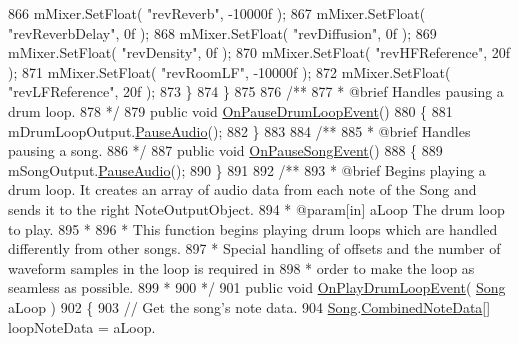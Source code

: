 \begin{DoxyCodeInclude}
866             mMixer.SetFloat( \textcolor{stringliteral}{"revReverb"}, -10000f );
867             mMixer.SetFloat( \textcolor{stringliteral}{"revReverbDelay"}, 0f );
868             mMixer.SetFloat( \textcolor{stringliteral}{"revDiffusion"}, 0f );
869             mMixer.SetFloat( \textcolor{stringliteral}{"revDensity"}, 0f );
870             mMixer.SetFloat( \textcolor{stringliteral}{"revHFReference"}, 20f );
871             mMixer.SetFloat( \textcolor{stringliteral}{"revRoomLF"}, -10000f );
872             mMixer.SetFloat( \textcolor{stringliteral}{"revLFReference"}, 20f );
873         \}
874     \}
875 \textcolor{comment}{}
876 \textcolor{comment}{    /**}
877 \textcolor{comment}{     * @brief Handles pausing a drum loop.}
878 \textcolor{comment}{    */}
879     \textcolor{keyword}{public} \textcolor{keywordtype}{void} \hyperlink{group___v_i_m_handlers_ga30cd7f00fea55becd6d90f0ec737510a}{OnPauseDrumLoopEvent}()
880     \{
881         mDrumLoopOutput.\hyperlink{group___n_o_o_pub_func_ga7977bc941f355866c7e4c141a8f7b8bb}{PauseAudio}();
882     \}
883 \textcolor{comment}{}
884 \textcolor{comment}{    /**}
885 \textcolor{comment}{     * @brief Handles pausing a song.}
886 \textcolor{comment}{    */}
887     \textcolor{keyword}{public} \textcolor{keywordtype}{void} \hyperlink{group___v_i_m_handlers_gad052b3cc53b35b25631f9b399be489ae}{OnPauseSongEvent}()
888     \{
889         mSongOutput.\hyperlink{group___n_o_o_pub_func_ga7977bc941f355866c7e4c141a8f7b8bb}{PauseAudio}();
890     \}
891 \textcolor{comment}{}
892 \textcolor{comment}{    /** }
893 \textcolor{comment}{     * @brief Begins playing a drum loop. It creates an array of audio data from each note of the Song and
       sends it to the right NoteOutputObject.}
894 \textcolor{comment}{     * @param[in] aLoop The drum loop to play.}
895 \textcolor{comment}{     * }
896 \textcolor{comment}{     * This function begins playing drum loops which are handled differently from other songs. }
897 \textcolor{comment}{     * Special handling of offsets and the number of waveform samples in the loop is required in}
898 \textcolor{comment}{     * order to make the loop as seamless as possible.}
899 \textcolor{comment}{     *  }
900 \textcolor{comment}{     */}
901     \textcolor{keyword}{public} \textcolor{keywordtype}{void} \hyperlink{group___v_i_m_handlers_gae2e2010b9a36ae2409466181ae0b9679}{OnPlayDrumLoopEvent}( \hyperlink{class_song}{Song} aLoop )
902     \{
903         \textcolor{comment}{// Get the song's note data.}
904         \hyperlink{class_song}{Song}.\hyperlink{group___song_structs_struct_song_1_1_combined_note_data}{CombinedNoteData}[] loopNoteData = aLoop.

\end{DoxyCodeInclude}
